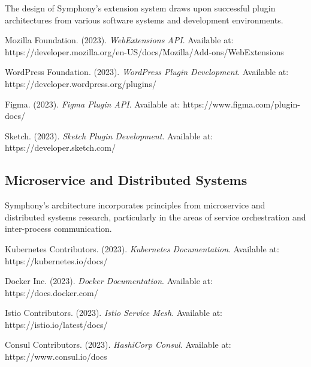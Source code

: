 The design of Symphony's extension system draws upon successful plugin architectures from various software systems and development environments.

\begin{compactlist}
    \item Mozilla Foundation. (2023). \textit{WebExtensions API}. Available at: https://developer.mozilla.org/en-US/docs/Mozilla/Add-ons/WebExtensions
    \item WordPress Foundation. (2023). \textit{WordPress Plugin Development}. Available at: https://developer.wordpress.org/plugins/
    \item Figma. (2023). \textit{Figma Plugin API}. Available at: https://www.figma.com/plugin-docs/
    \item Sketch. (2023). \textit{Sketch Plugin Development}. Available at: https://developer.sketch.com/
\end{compactlist}

\subsection*{Microservice and Distributed Systems}

Symphony's architecture incorporates principles from microservice and distributed systems research, particularly in the areas of service orchestration and inter-process communication.

\begin{compactlist}
    \item Kubernetes Contributors. (2023). \textit{Kubernetes Documentation}. Available at: https://kubernetes.io/docs/
    \item Docker Inc. (2023). \textit{Docker Documentation}. Available at: https://docs.docker.com/
    \item Istio Contributors. (2023). \textit{Istio Service Mesh}. Available at: https://istio.io/latest/docs/
    \item Consul Contributors. (2023). \textit{HashiCorp Consul}. Available at: https://www.consul.io/docs
\end{compactlist}

